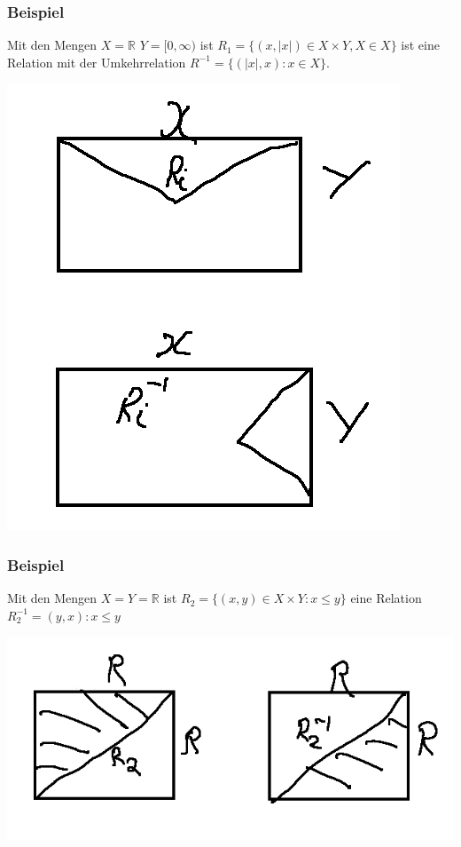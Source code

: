 \subsubsection{Beispiel}
Mit den Mengen $X=\mathbb{R}$ $Y=[0,\infty)$ ist $R_1=\{(x,\left| x\right|) \in X\times Y, X\in X\}$ ist eine Relation mit der Umkehrrelation $R^{-1}=\{(\left| x\right|,x):x\in X\}$.\\
\begin{center}
\includegraphics[scale=0.4]{1-1-3.jpg}
\end{center}
\subsubsection{Beispiel}
Mit den Mengen $X=Y=\mathbb{R}$ ist $R_2=\{(x,y)\in X\times Y:x \leq y\}$
eine Relation $R^{-1}_{2}={(y,x):x\leq y}$ \\
 \begin{center}
\includegraphics[scale=0.4]{1-1-4.jpg}
\end{center}
